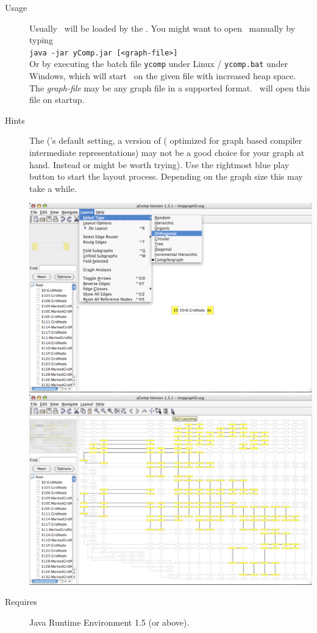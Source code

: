 \begin{description}
  \item[Usage] Usually \yComp\ will be loaded by the \GrShell. You might want to open \yComp\ manually by typing\\
   \texttt{java -jar yComp.jar [<graph-file>]}\\
  Or by executing the batch file \texttt{ycomp} under Linux / \texttt{ycomp.bat} under Windows, 
  which will start \yComp\ on the given file with increased heap space. 
  The \emph{graph-file} may be any graph file in a supported format. \yComp\ will open this file on startup.
  \item[Hints] The   (\yComp's default setting, a version of (\texttt{} optimized for graph based compiler intermediate representations) may not be a good choice for your graph at hand. 
  Instead \texttt{} or \texttt{} might be worth trying). 
  Use the rightmost blue play button to start the layout process. Depending on the graph size this may take a while.
\begin{center}
\includegraphics[width=0.45\linewidth]{fig/ycomp1.pdf} \includegraphics[width=0.45\linewidth]{fig/ycomp2.pdf}
\end{center}
  \item[Requires] Java Runtime Environment 1.5 (or above).
\end{description}


